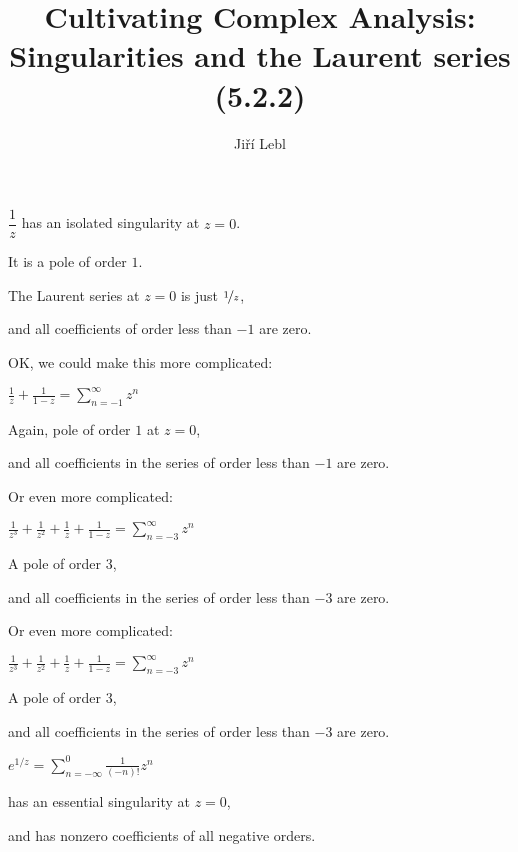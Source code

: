 \documentclass[10pt,aspectratio=169]{beamer}
\author{Ji\v{r}\'i Lebl}
\institute[OSU]{%
Departemento pri Matematiko de Oklahoma {\^S}tata Universitato}
\title{Cultivating Complex Analysis:\\%
Singularities and the Laurent series (5.2.2)}
\date{}
\begin{document}
\begin{frame}
\titlepage
\end{frame}

\begin{frame}
$\dfrac{1}{z}$ has an isolated singularity at $z=0$.

\medskip
\pause

It is a pole of order $1$.

\medskip
\pause

The Laurent series at $z=0$ is just $\nicefrac{1}{z}$,

and all
coefficients of order less than $-1$ are zero.

\end{frame}

\begin{frame}
OK, we could make this more complicated:

\medskip

$\displaystyle
\frac{1}{z} + \frac{1}{1-z}
=
\sum_{n=-1}^\infty z^n
$

\medskip
\pause

Again, pole of order $1$ at $z=0$,

and all coefficients in the series
of order less than $-1$ are zero.

\end{frame}

\begin{frame}
Or even more complicated:

\medskip

$\displaystyle
\frac{1}{z^3} + \frac{1}{z^2} + \frac{1}{z} + \frac{1}{1-z}
=
\sum_{n=-3}^\infty z^n
$

\medskip
\pause

A pole of order $3$,

and all coefficients in the series
of order less than $-3$ are zero.
\end{frame}

\begin{frame}
Or even more complicated:

\medskip

$\displaystyle
\frac{1}{z^3} + \frac{1}{z^2} + \frac{1}{z} + \frac{1}{1-z}
=
\sum_{n=-3}^\infty z^n
$

\medskip
\pause

A pole of order $3$,

and all coefficients in the series
of order less than $-3$ are zero.
\end{frame}

\begin{frame}
$\displaystyle
e^{1/z}
=
\sum_{n=-\infty}^0 \frac{1}{(-n)!} z^n
$

\medskip

has an essential singularity at $z=0$,

and has nonzero coefficients of all negative orders.
\end{frame}
\end{document}
